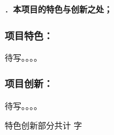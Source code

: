 {\sihao \color{MsBlue} ．{\bfseries 本项目的特色与创新之处；}}

\subsubsection{{\bfseries 项目特色：}}

待写。。。。


\subsubsection{{\bfseries 项目创新：}}

待写。。。。


\ifhandout
\else
\begin{center}
{\larger[2]\color{red}  特色创新部分共计 \wordcount 字 }
\end{center}
\fi


\vskip 5mm
